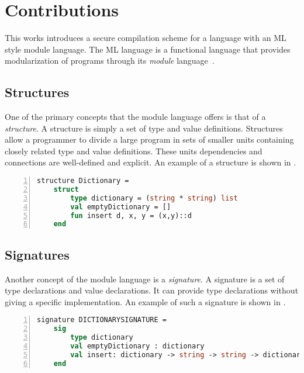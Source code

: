 \documentclass[11pt]{article}
\begin{document}
\section{Contributions}
This works introduces a secure compilation scheme for a language with an ML style module language.
The ML language is a functional language that provides modularization of programs through its \emph{module} language~\cite{Milner:1997:DSM:549659}.

\subsection{Structures}
One of the primary concepts that the module language offers is that of a \emph{structure}. A structure is simply a set of type and value definitions.
Structures allow a programmer to divide a large program in sets of smaller units containing closely related type and value definitions.
These units dependencies and connections are well-defined and explicit.
An example of a structure is shown in .

\begin{lstlisting}[frame=single, language=ML,caption={[Dictionary Definition Example]An example structure showing the definition of a dictionary in ML.}, label=lst:DictionaryStructureExample,numbers=left]
structure Dictionary =
    struct
        type dictionary = (string * string) list
        val emptyDictionary = []
        fun insert d, x, y = (x,y)::d
    end
\end{lstlisting}

\subsection{Signatures}
Another concept of the module language is a \emph{signature}.
A signature is a set of type declarations and value declarations. It can provide type declarations without giving a specific implementation.
An example of such a signature is shown in .

\begin{lstlisting}[frame=single, language=ML, caption={[Dictionary Declaration Example]An example signature showing the declaration of a dictionary in ML.}, label=lst:DictionarySignatureExample, numbers=left]
signature DICTIONARYSIGNATURE =
    sig
        type dictionary
        val emptyDictionary : dictionary
        val insert: dictionary -> string -> string -> dictionary
    end
\end{lstlisting}
\end{document}
